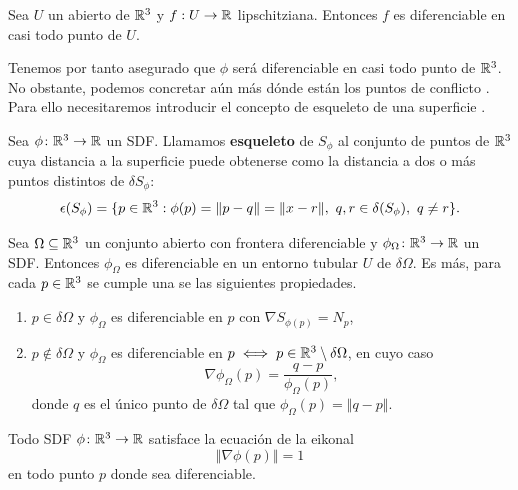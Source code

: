 \begin{proposicion}
    Sea $U$ un abierto de $\mathbb{R}^3$ y $f:U\to \mathbb{R}$ lipschitziana. Entonces $f$ es diferenciable en casi todo punto de $U$.
\end{proposicion}

Tenemos por tanto asegurado que $\phi$ será diferenciable en casi todo punto de $\mathbb{R}^3$. No obstante, podemos concretar aún más dónde están los puntos de conflicto \cite{dif1} \cite{dif2}. Para ello necesitaremos introducir el concepto de esqueleto de una superficie \cite{derivWiki}.
\begin{definicion}
    Sea $\phi \colon \mathbb{R}^3\to \mathbb{R}$ un SDF. Llamamos \textbf{esqueleto} de $S_{\phi}$ al conjunto de puntos de $\mathbb{R}^3$ cuya distancia a la superficie puede obtenerse como la distancia a dos o más puntos distintos de $\delta S_{\phi}$:
    \begin{equation}
        \epsilon(S_{\phi}) = \{p\in \mathbb{R}^3 : \phi(p) = \Vert p-q\Vert = \Vert x-r\Vert,\ q,r\in \delta(S_{\phi}),\ q\neq r \}.
    \end{equation}
\end{definicion}

\begin{teorema}
    Sea $\Omega \subseteq \mathbb{R}^3$ un conjunto abierto con frontera diferenciable y $\phi_{\Omega} \colon \mathbb{R}^3\to \mathbb{R}$ un SDF. Entonces $\phi_{\Omega}$ es diferenciable en un entorno tubular $U$ de $\delta \Omega$. Es más, para cada $p\in \mathbb{R}^3$ se cumple una se las siguientes propiedades.
    \begin{enumerate}
        \item $p\in \delta \Omega$ y $\phi_{\Omega}$ es diferenciable en $p$ con $\nabla S_{\phi(p)} = N_p$,
        \item $p\notin \delta \Omega$ y $\phi_{\Omega}$ es diferenciable en $p \iff p\in \mathbb{R}^3\setminus \delta\Omega$, en cuyo caso
        \begin{equation*}
            \nabla \phi_{\Omega}(p) = \frac{q-p}{\phi_{\Omega}(p)},
        \end{equation*}
        donde $q$ es el único punto de $\delta\Omega$ tal que $\phi_{\Omega}(p) = \Vert q-p\Vert$.
    \end{enumerate}
\end{teorema}

\begin{corolario}
    Todo SDF $\phi\colon \mathbb{R}^3\to \mathbb{R}$ satisface la ecuación de la eikonal 
    \begin{equation*}
        \Vert \nabla \phi(p)\Vert = 1
    \end{equation*}
    en todo punto $p$ donde sea diferenciable.
\end{corolario}

